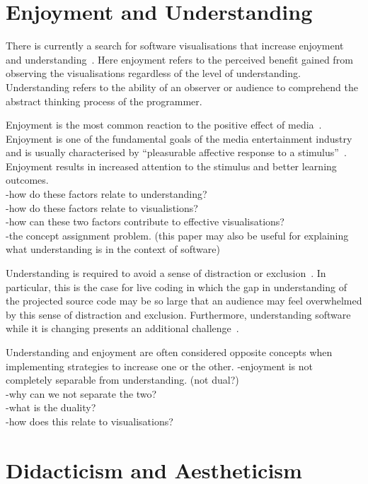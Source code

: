 \section{Enjoyment and Understanding}

There is currently a search for software visualisations that increase enjoyment and understanding~\cite{McLean2010a}. Here enjoyment refers to the perceived benefit gained from observing the visualisations regardless of the level of understanding. Understanding refers to the ability of an observer or audience to comprehend the abstract thinking process of the programmer.

Enjoyment is the most common reaction to the positive effect of media~\cite{Vorderer2004}. Enjoyment is one of the fundamental goals of the media entertainment industry and is usually characterised by ``pleasurable affective response to a stimulus''~\cite{Brock2004}. Enjoyment results in increased attention to the stimulus and better learning outcomes.\\
-how do these factors relate to understanding?\\
-how do these factors relate to visualistions?\\
-how can these two factors contribute to effective visualisations?\\
-the concept assignment problem. \cite{Biggerstaff1994} (this paper may also be useful for explaining what understanding is in the context of software)

Understanding is required to avoid a sense of distraction or exclusion~\cite{McLean2010a}. In particular, this is the case for live coding in which the gap in understanding of the projected source code may be so large that an audience may feel overwhelmed by this sense of distraction and exclusion. Furthermore, understanding software while it is changing presents an additional challenge~\cite{Eisenbarth2003}.

Understanding and enjoyment are often considered opposite concepts when implementing strategies to increase one or the other. 
-enjoyment is not completely separable from understanding. (not dual?)\\
-why can we not separate the two?\\
-what is the duality?\\
-how does this relate to visualisations?


\section{Didacticism and Aestheticism}

